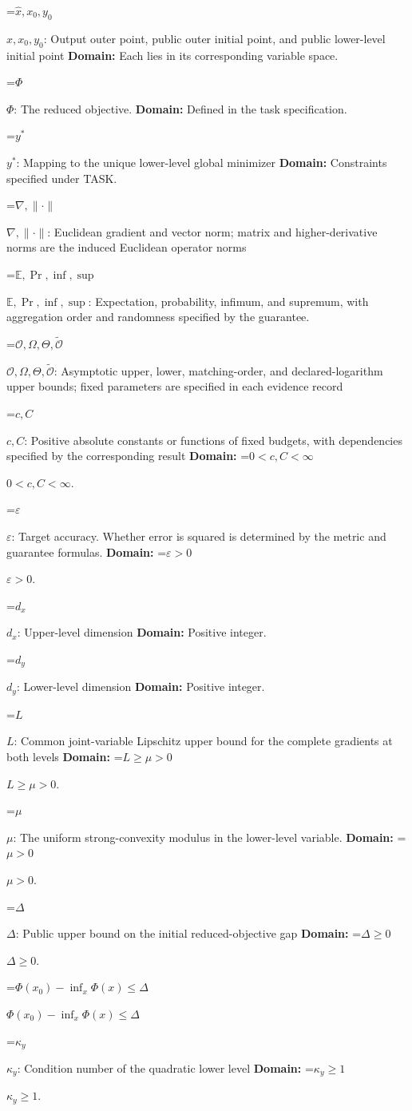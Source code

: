 \documentclass[10pt,a4paper]{article}
\newcommand{\AtlasMath}[1]{\par\begingroup\centering\setbox0=\hbox{$\displaystyle #1$}\ifdim\wd0>1.4\linewidth\typeout{ATLAS WIDE FORMULA: \the\wd0}\fi\ifdim\wd0>\linewidth\resizebox{\linewidth}{!}{\box0}\else\box0\fi\par\endgroup}
\newcommand{\AtlasInlineMath}[1]{\begingroup\setbox0=\hbox{$#1$}\ifdim\wd0>.4\linewidth\endgroup\AtlasMath{#1}\else\endgroup$#1$\fi}
\begin{document}
\AtlasInlineMath{\widehat x,x_0,y_0}: Output outer point, public outer initial point, and public lower-level initial point \textbf{Domain:} Each lies in its corresponding variable space.

\AtlasInlineMath{\Phi}: The reduced objective. \textbf{Domain:} Defined in the task specification.

\AtlasInlineMath{y^*}: Mapping to the unique lower-level global minimizer \textbf{Domain:} Constraints specified under TASK.

\AtlasInlineMath{\nabla,\|\cdot\|}: Euclidean gradient and vector norm; matrix and higher-derivative norms are the induced Euclidean operator norms

\AtlasInlineMath{\mathbb E,\Pr,\inf,\sup}: Expectation, probability, infimum, and supremum, with aggregation order and randomness specified by the guarantee.

\AtlasInlineMath{\mathcal O,\Omega,\Theta,\widetilde{\mathcal O}}: Asymptotic upper, lower, matching-order, and declared-logarithm upper bounds; fixed parameters are specified in each evidence record

\AtlasInlineMath{c,C}: Positive absolute constants or functions of fixed budgets, with dependencies specified by the corresponding result \textbf{Domain:} \AtlasInlineMath{0<c,C<\infty}.

\AtlasInlineMath{\varepsilon}: Target accuracy. Whether error is squared is determined by the metric and guarantee formulas. \textbf{Domain:} \AtlasInlineMath{\varepsilon>0}.

\AtlasInlineMath{d_x}: Upper-level dimension \textbf{Domain:} Positive integer.

\AtlasInlineMath{d_y}: Lower-level dimension \textbf{Domain:} Positive integer.

\AtlasInlineMath{L}: Common joint-variable Lipschitz upper bound for the complete gradients at both levels \textbf{Domain:} \AtlasInlineMath{L\ge\mu>0}.

\AtlasInlineMath{\mu}: The uniform strong-convexity modulus in the lower-level variable. \textbf{Domain:} \AtlasInlineMath{\mu>0}.

\AtlasInlineMath{\Delta}: Public upper bound on the initial reduced-objective gap \textbf{Domain:} \AtlasInlineMath{\Delta\ge0}.

\AtlasInlineMath{\Phi(x_0)-\inf_x\Phi(x)\le\Delta}

\AtlasInlineMath{\kappa_y}: Condition number of the quadratic lower level \textbf{Domain:} \AtlasInlineMath{\kappa_y\ge1}.
\end{document}
